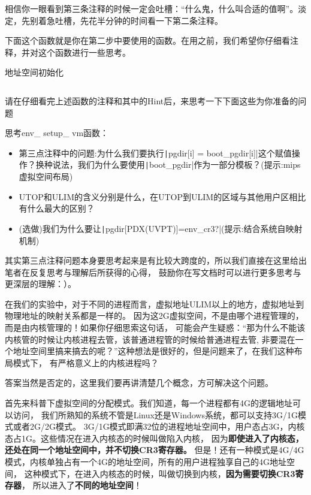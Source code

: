 相信你一眼看到第三条注释的时候一定会吐槽：“什么鬼，什么叫合适的值啊”。淡定，先别着急吐槽，先花半分钟的时间看一下第二条注释。

下面这个函数就是你在第二步中要使用的函数。在用之前，我们希望你仔细看注释，并对这个函数进行一些思考。

\begin{codeBoxWithCaption}{地址空间初始化\label{code:env_setup_vm.c}}
  \inputminted[linenos]{c}{codes/env_setup_vm.c}
\end{codeBoxWithCaption}

请在仔细看完上述函数的注释和其中的Hint后，来思考一下下面这些为你准备的问题

\begin{thinking}\label{think-env_setup_vm}
思考env\_ setup\_ vm函数：
\begin{itemize}
\item 第三点注释中的问题:为什么我们要执行\texttt|pgdir[i] = boot_pgdir[i]|这个赋值操作？换种说法，我们为什么要使用\texttt|boot_pgdir|作为一部分模板？(提示:mips虚拟空间布局)
\item {\small UTOP}和{\small ULIM}的含义分别是什么，在{\small UTOP}到{\small ULIM}的区域与其他用户区相比有什么最大的区别？
\item (选做)我们为什么要让\texttt|pgdir[PDX(UVPT)]=env_cr3?|(提示:结合系统自映射机制)
\end{itemize}
\end{thinking}

其实第三点注释问题本身要思考起来是有比较大跨度的，所以我们直接在这里给出笔者在反复思考与理解后所获得的心得，
鼓励你在写文档时可以进行更多思考与更深层的理解：）。

在我们的实验中，对于不同的进程而言，虚拟地址ULIM以上的地方，虚拟地址到物理地址的映射关系都是一样的。
因为这2G虚拟空间，不是由哪个进程管理的，而是由内核管理的！如果你仔细思索这句话，
可能会产生疑惑：“那为什么不能该内核管的时候让内核进程去管，该普通进程管的时候给普通进程去管,
非要混在一个地址空间里搞来搞去的呢？”这种想法是很好的，但是问题来了，在我们这种布局模式下，
有严格意义上的内核进程吗？

答案当然是否定的，这里我们要再讲清楚几个概念，方可解决这个问题。

首先来科普下虚拟空间的分配模式。我们知道，每一个进程都有4G的逻辑地址可以访问，
我们所熟知的系统不管是Linux还是Windows系统，都可以支持3G/1G模式或者2G/2G模式。
3G/1G模式即满32位的进程地址空间中，用户态占3G，内核态占1G。这些情况在进入内核态的时候叫做陷入内核，
因为\textbf{即使进入了内核态，还处在同一个地址空间中，并不切换CR3寄存器。}
但是！还有一种模式是4G/4G模式，内核单独占有一个4G的地址空间，所有的用户进程独享自己的4G地址空间，
这种模式下，在进入内核态的时候，叫做切换到内核，\textbf{因为需要切换CR3寄存器}，
所以进入了\textbf{不同的地址空间}！

